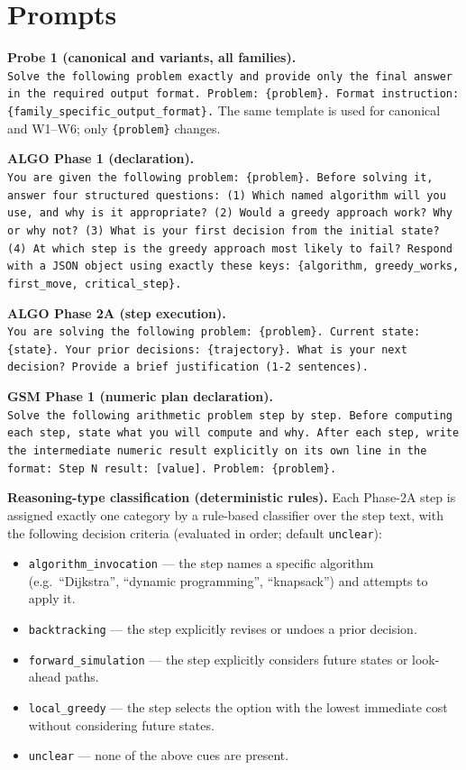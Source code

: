 

\section{Prompts}
\label{app:prompts}

\textbf{Probe 1 (canonical and variants, all families).}\\
\texttt{Solve the following problem exactly and provide only the final answer
in the required output format. Problem: \{problem\}. Format instruction:
\{family\_specific\_output\_format\}.} The same template is used for canonical
and W1--W6; only \texttt{\{problem\}} changes.

\textbf{ALGO Phase 1 (declaration).}\\
\texttt{You are given the following problem: \{problem\}. Before solving it,
answer four structured questions: (1) Which named algorithm will you use, and
why is it appropriate? (2) Would a greedy approach work? Why or why not? (3)
What is your first decision from the initial state? (4) At which step is the
greedy approach most likely to fail? Respond with a JSON object using exactly
these keys: \{algorithm, greedy\_works, first\_move, critical\_step\}.}

\textbf{ALGO Phase 2A (step execution).}\\
\texttt{You are solving the following problem: \{problem\}. Current state:
\{state\}. Your prior decisions: \{trajectory\}. What is your next decision?
Provide a brief justification (1{-}2 sentences).}

\textbf{GSM Phase 1 (numeric plan declaration).}\\
\texttt{Solve the following arithmetic problem step by step. Before computing
each step, state what you will compute and why. After each step, write the
intermediate numeric result explicitly on its own line in the format: Step N
result: [value]. Problem: \{problem\}.}

\textbf{Reasoning-type classification (deterministic rules).} Each Phase-2A
step is assigned exactly one category by a rule-based classifier over the step
text, with the following decision criteria (evaluated in order; default
\texttt{unclear}):
\begin{itemize}
  \item \texttt{algorithm\_invocation} --- the step names a specific algorithm
  (e.g.\ ``Dijkstra'', ``dynamic programming'', ``knapsack'') and attempts to
  apply it.
  \item \texttt{backtracking} --- the step explicitly revises or undoes a prior
  decision.
  \item \texttt{forward\_simulation} --- the step explicitly considers future
  states or look-ahead paths.
  \item \texttt{local\_greedy} --- the step selects the option with the lowest
  immediate cost without considering future states.
  \item \texttt{unclear} --- none of the above cues are present.
\end{itemize}

